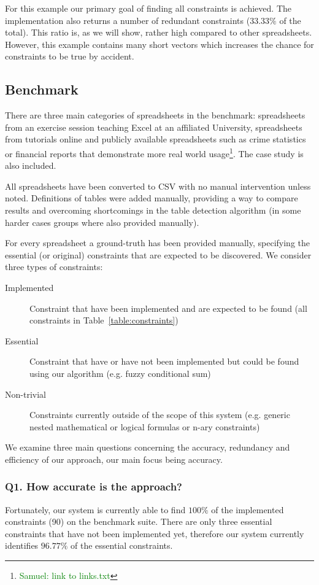 \documentclass{sig-alternate-05-2015}
\newcommand{\samuel}[1]{\textcolor{green}{{\sc Samuel:} #1}\xspace}
\begin{document}
For this example our primary goal of finding all constraints is achieved.
The implementation also returns a number of redundant constraints ($33.33\%$ of the total).
This ratio is, as we will show, rather high compared to other spreadsheets.
However, this example contains many short vectors which increases the chance for constraints to be true by accident.

\subsection{Benchmark}
There are three main categories of spreadsheets in the benchmark: spreadsheets from an exercise session teaching Excel at an affiliated University, spreadsheets from tutorials online and publicly available spreadsheets such as crime statistics or financial reports that demonstrate more real world usage\footnote{\samuel{link to links.txt}}.
The case study is also included.

All spreadsheets have been converted to CSV with no manual intervention unless noted.
Definitions of tables were added manually, providing a way to compare results and overcoming shortcomings in the table detection algorithm (in some harder cases groups where also provided manually).

For every spreadsheet a ground-truth has been provided manually, specifying the essential (or original) constraints that are expected to be discovered.
We consider three types of constraints:
\begin{description}
  \item[Implemented] Constraint that have been implemented and are expected to be found (all constraints in Table~\ref{table:constraints})
  \item[Essential] Constraint that have or have not been implemented but could be found using our algorithm (e.g. fuzzy conditional sum)
  \item[Non-trivial] Constraints currently outside of the scope of this system (e.g. generic nested mathematical or logical formulas or n-ary constraints)
\end{description}

We examine three main questions concerning the accuracy, redundancy and efficiency of our approach, our main focus being accuracy.

\subsubsection*{Q1. How accurate is the approach?}
Fortunately, our system is currently able to find $100\%$ of the implemented constraints (90) on the benchmark suite.
There are only three essential constraints that have not been implemented yet, therefore our system currently identifies $96.77\%$ of the essential constraints.
\end{document}
